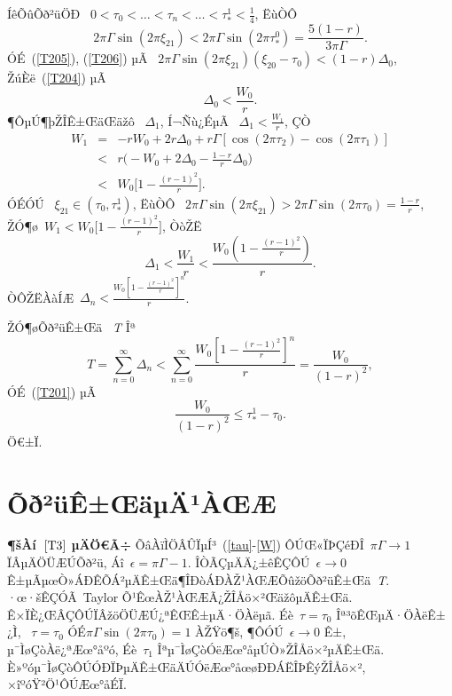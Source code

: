 \documentclass[12pt,openany,CJK,oneside]{cctbook}
\begin{document}
{ÍêÕûÕð²üÖÐ \ $0<\tau_0<\dots<\tau_n<\dots<\tau^1_*<\frac{1}{4}$,  ËùÒÔ
\begin{equation}\label{T206}
  2\pi\Gamma\sin(2\pi\xi_{21})<2\pi\Gamma\sin(2\pi\tau^0_*)=\frac{5(1-r)}{3\pi\Gamma}.
\end{equation}
ÓÉ\ (\ref{T205}), (\ref{T206}) µÃ \ $2\pi\Gamma\sin(2\pi\xi_{21})(\xi_{20}-\tau_0)<(1-r)\Delta_0$, ŽúÈë\ (\ref{T204}) µÃ
\begin{equation}\label{T207}
  \Delta_0<\frac{W_0}{r}.
\end{equation}
 ¶ÔµÚ¶þŽÎÊ±ŒäŒäžô \ $\Delta_1$, Í¬Ñù¿ÉµÃ \ $\Delta_1<\frac{W_1}{r}$, ÇÒ
 \begin{eqnarray*}
   W_1 &=& -rW_0+2r\Delta_0+r\Gamma[\cos(2\pi\tau_2)-\cos(2\pi\tau_1)] \\
      &<&  r\Big(-W_0+2\Delta_0-\frac{1-r}{r}\Delta_0\Big)\\
    &<&  W_0\Big[1-\frac{(r-1)^2}{r}\Big].
 \end{eqnarray*}
ÓÉÓÚ \ $\xi_{21}\in(\tau_0,\tau^1_*)$, ËùÒÔ \ $2\pi\Gamma\sin(2\pi\xi_{21})>2\pi\Gamma\sin(2\pi\tau_0)=\frac{1-r}{r}$, ŽÓ¶ø\ $W_1<W_0\Big[1-\frac{(r-1)^2}{r}\Big]$, ÒòŽË
\begin{equation}
   \Delta_1<\frac{W_1}{r}<\frac{W_0(1-\frac{(r-1)^2}{r})}{r}.
   \end{equation}
ÒÔŽËÀàÍÆ\ $\Delta_n<\frac{W_0[1-\frac{(r-1)^2}{r}]^n}{r}$.

ŽÓ¶øÕð²üÊ±Œä \ \emph{T} Îª
 \begin{equation}
 T=\sum_{n=0}^{\infty}\Delta_n<\sum_{n=0}^\infty\frac{W_0[1-\frac{(r-1)^2}{r}]^n}{r}=\frac{W_0}{(1-r)^2},
\end{equation}
ÓÉ\ (\ref{T201}) µÃ
\begin{equation}
  \frac{W_0}{(1-r)^2}\leq\tau^1_*-\tau_0.
\end{equation}Ö€±Ï.
\section{\kaishu Õð²üÊ±ŒäµÄ¹ÀŒÆ}

{\heiti \textbf{¶šÀí\ $\ref{T3}$ µÄÖ€Ã÷} }
ÕâÀïÌÖÂÛÏµÍ³\ (\ref{tau}-\ref{W}) ÔÚŒ«ÏÞÇéÐÎ\ $\pi\Gamma\rightarrow1$ ÏÂµÄÖÜÆÚÕð²ü, Áî\ $\epsilon=\pi\Gamma-1$. ÎÒÃÇµÄÄ¿±êÊÇÔÚ\ $\epsilon\rightarrow 0$ Ê±µÃµœÒ»ÁÐÊÕÁ²µÄÊ±Œä¶ÎÐòÁÐÀŽ¹ÀŒÆÕûžöÕð²üÊ±Œä\ \emph{T}. ·œ·šÊÇÓÃ\ Taylor Õ¹ÊœÀŽ¹ÀŒÆÃ¿ŽÎÅö×²ŒäžôµÄÊ±Œä. Ê×ÏÈ¿ŒÂÇÔÚÏÂžöÖÜÆÚ¿ªÊŒÊ±µÄ·ÖÀëµã. Éè\ $\tau=\tau_{0}$ Îª³õÊŒµÄ·ÖÀëÊ±¿Ì, \ $\tau=\tau_{0}$ ÓÉ$\pi\Gamma\sin(2\pi\tau_{0})=1$ ÀŽŸö¶š, ¶ÔÓÚ\ $\epsilon\rightarrow 0$ Ê±, µ¯ÌøÇòÀë¿ªÆœ°åºó, Éè\ $\tau_{1}$ Îªµ¯ÌøÇòÓëÆœ°åµÚÒ»ŽÎÅö×²µÄÊ±Œä. È»ºóµ¯ÌøÇòÔÚÓÐÏÞµÄÊ±ŒäÄÚÓëÆœ°åœøÐÐÁËÎÞÊýŽÎÅö×², ×îºóŸ²Ö¹ÔÚÆœ°åÉÏ.

}
\end{document}
